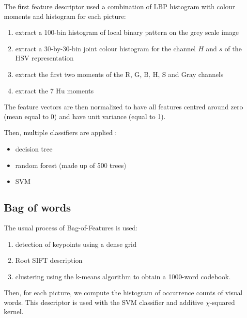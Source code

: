 The first feature descriptor used a combination of LBP histogram with colour moments and histogram for each picture:
\begin{enumerate}
    \item extract a 100-bin histogram of local binary pattern on the grey scale image
    \item extract a 30-by-30-bin joint colour histogram for the channel $H$ and $s$ of the HSV  representation
    \item extract the first two moments of the R, G, B, H, S and Gray channels
    \item extract the 7 Hu moments
\end{enumerate}

The feature vectors are then normalized to have all features centred around zero (mean equal to 0) and have unit variance (equal to 1).

Then, multiple classifiers are applied :
\begin{itemize}
    \item decision tree
    \item random forest (made up of 500 trees)
    \item SVM
\end{itemize}


\subsection{Bag of words}

The usual process of Bag-of-Features is used:
\begin{enumerate}
    \item detection of keypoints using a dense grid
    \item Root SIFT description
    \item clustering using the k-means algorithm to obtain a 1000-word codebook.
\end{enumerate}

Then, for each picture, we compute the histogram of occurrence counts of visual words. This descriptor is used with the SVM classifier and additive $\chi$-squared kernel.

